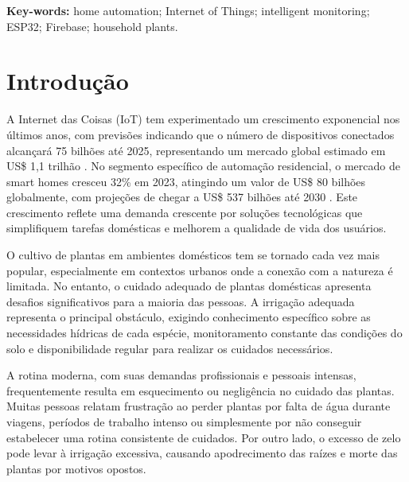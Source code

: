 \documentclass[twoside,english,brazilian]{UNISINOSmonografia}
\begin{document}
\medskip
\noindent\textbf{Key-words:} home automation; Internet of Things; intelligent monitoring; ESP32; Firebase; household plants.

\chapter{Introdução}

A Internet das Coisas (IoT) tem experimentado um crescimento exponencial nos últimos anos, com previsões indicando que o número de dispositivos conectados alcançará 75 bilhões até 2025, representando um mercado global estimado em US\$ 1,1 trilhão \cite{iot2024}. No segmento específico de automação residencial, o mercado de smart homes cresceu 32\% em 2023, atingindo um valor de US\$ 80 bilhões globalmente, com projeções de chegar a US\$ 537 bilhões até 2030 \cite{smarthome2024}. Este crescimento reflete uma demanda crescente por soluções tecnológicas que simplifiquem tarefas domésticas e melhorem a qualidade de vida dos usuários.

O cultivo de plantas em ambientes domésticos tem se tornado cada vez mais popular, especialmente em contextos urbanos onde a conexão com a natureza é limitada. No entanto, o cuidado adequado de plantas domésticas apresenta desafios significativos para a maioria das pessoas. A irrigação adequada representa o principal obstáculo, exigindo conhecimento específico sobre as necessidades hídricas de cada espécie, monitoramento constante das condições do solo e disponibilidade regular para realizar os cuidados necessários.

A rotina moderna, com suas demandas profissionais e pessoais intensas, frequentemente resulta em esquecimento ou negligência no cuidado das plantas. Muitas pessoas relatam frustração ao perder plantas por falta de água durante viagens, períodos de trabalho intenso ou simplesmente por não conseguir estabelecer uma rotina consistente de cuidados. Por outro lado, o excesso de zelo pode levar à irrigação excessiva, causando apodrecimento das raízes e morte das plantas por motivos opostos.

\end{document}
